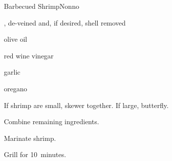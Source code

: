 \begin{recipe}{Barbecued Shrimp}{Nonno}{}

\begin{ingredients}
\item {}, de-veined and, if desired, shell removed
\item olive oil
\item red wine vinegar
\item garlic
\item oregano
\end{ingredients}

\begin{directions}
\item If shrimp are small, skewer together. If large, butterfly.
\item Combine remaining ingredients.
\item Marinate shrimp.
\item Grill for 10~minutes.
\end{directions}

\end{recipe}
